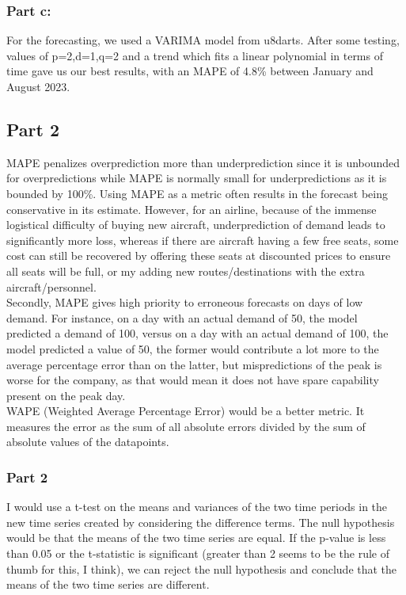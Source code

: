\documentclass{article}
\begin{document}
\subsubsection{Part c: }
For the forecasting,  we used a VARIMA model from u8darts. After some testing, values of p=2,d=1,q=2 and a trend which fits a linear polynomial in terms of time gave us our best results,  with an MAPE of 4.8\% between January and August 2023. 
\subsection{Part 2}
MAPE penalizes overprediction more than underprediction since it is unbounded for overpredictions while MAPE is normally small for underpredictions as it is bounded by 100\%. Using MAPE as a metric often results in the forecast being conservative in its estimate. However,  for an airline,  because of the immense logistical difficulty of buying new aircraft,  underprediction of demand leads to significantly more loss,  whereas if there are aircraft having a few free seats,  some cost can still be recovered by offering these seats at discounted prices to ensure all seats will be full,  or my adding new routes/destinations with the extra aircraft/personnel.\\
Secondly,  MAPE gives high priority to erroneous forecasts on days of low demand. For instance,  on a day with an actual demand of 50,  the model predicted a demand of 100,  versus on a day with an actual demand of 100,  the model predicted a value of 50,  the former would contribute a lot more to the average percentage error than on the latter,  but mispredictions of the peak is worse for the company,  as that would mean it does not have spare capability present on the peak day.\\
WAPE (Weighted Average Percentage Error) would be a better metric. It measures the error as the sum of all absolute errors divided by the sum of absolute values of the datapoints.
\subsubsection{Part 2}
I would use a t-test on the means and variances of the two time periods in the new time series created by considering the difference terms. The null hypothesis would be that the means of the two time series are equal. If the p-value is less than 0.05 or the t-statistic is significant (greater than 2 seems to be the rule of thumb for this,  I think),  we can reject the null hypothesis and conclude that the means of the two time series are different.
\end{document}
